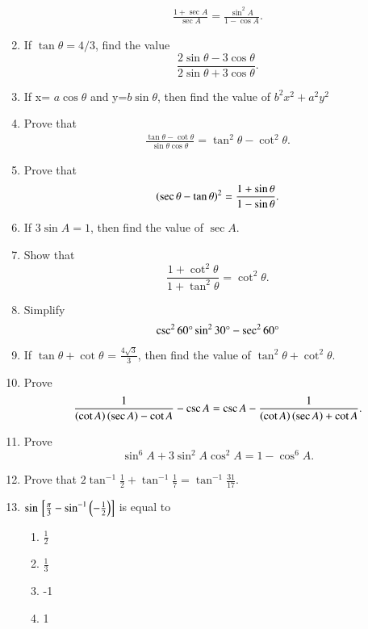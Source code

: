 \begin{enumerate}[label=\thesubsection.\arabic*,ref=\thesubsection.\theenumi,itemsep=1pt]
\begin{align*}
\frac{1+\sec A}{\sec A}=\frac{\sin^2 A}{1-\cos A} 
.\end{align*}
\hfill{}\item If  $\tan \theta = 4/3$, find the value 
$$\frac{2\sin \theta -3\cos \theta}{2\sin\theta+3\cos\theta}.$$
\hfill{}\item If x=  $a\cos\theta$ and y=$b\sin\theta$, then find the value of   $b^2x^2+a^2y^2$
\hfill{}\item Prove that 
\begin{align*}
\frac{\tan\theta-\cot\theta}{\sin\theta\cos\theta}=\tan^2\theta-\cot^2\theta 
.\end{align*}
\hfill{}\item Prove that
\begin{align*}
\left(\sec\theta-\tan\theta\right)^2 =\frac{1+\sin\theta}{1-\sin\theta}
.\end{align*}
		\hfill{}\item If $3\sin A = 1$, then find the value of $\sec A$.
		\hfill{}\item Show that $$\frac{1 + \cot^2{\theta}}{1 + \tan^2{\theta}} = \cot^2{\theta}.$$
\hfill{}\item Simplify $${\csc^{2}{60\degree} \sin^{2}{30\degree} - \sec^{2}{60\degree}}$$
	\hfill{}\item If $\tan{\theta} + \cot{\theta}$ = $\frac{4 \sqrt{3}}{3}$, then find the value of $\tan^{2}{\theta} + \cot^{2}{\theta}$. 
		\hfill{}\item Prove$$\frac{1}{\left(\cot A\right)\left(\sec A\right) - \cot A} - \csc A = \csc A - \frac{1}{\left(\cot A\right)\left(\sec A\right) + \cot A}.$$
		\hfill{}\item Prove$$\sin^{6} A + 3\sin^{2} A \cos^{2} A = 1 - \cos^{6}  A.$$
		\hfill{}
\item Prove that $2\tan^{-1}\frac{1}{2} + \tan^{-1}\frac{1}{7} = \tan^{-1}\frac{31}{17}$.
\hfill{}
\item $ \sin {}\left[\frac{\pi}{3}-\sin^{-1}\left(-\frac{1}{2}\right)\right] $ is equal to
\begin{multicols}{4}
\begin{enumerate}
\item $\frac{1}{2}$
\item $\frac{1}{3}$
\item -1
\item 1
\end{enumerate}
\end{multicols}

\end{enumerate}
